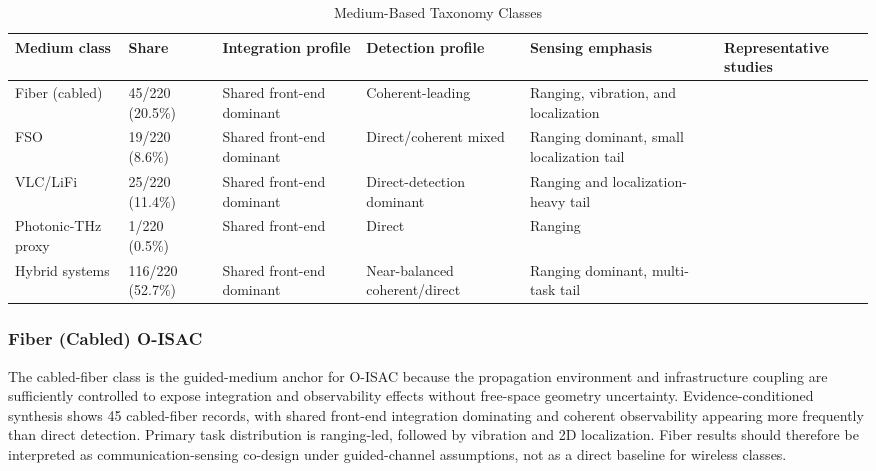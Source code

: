 \begin{table}[!t]
\caption{Medium-Based Taxonomy Classes}
\label{tab:medium-classes}
\centering
\footnotesize
\setlength{\tabcolsep}{4pt}
\begin{tabularx}{\textwidth}{p{}p{}p{}p{}p{}X}
\toprule
\textbf{Medium class} & \textbf{Share} & \textbf{Integration profile} & \textbf{Detection profile} & \textbf{Sensing emphasis} & \textbf{Representative studies} \\
\midrule
Fiber (cabled) & 45/220 (20.5\%) & Shared front-end dominant & Coherent-leading & Ranging, vibration, and localization & \cite{O_ISAC_006,O_ISAC_033,O_ISAC_046} \\
FSO & 19/220 (8.6\%) & Shared front-end dominant & Direct/coherent mixed & Ranging dominant, small localization tail & \cite{O_ISAC_021,O_ISAC_035,O_ISAC_199} \\
VLC/LiFi & 25/220 (11.4\%) & Shared front-end dominant & Direct-detection dominant & Ranging and localization-heavy tail & \cite{O_ISAC_068,O_ISAC_303,O_ISAC_039} \\
Photonic-THz proxy & 1/220 (0.5\%) & Shared front-end & Direct & Ranging & \cite{O_ISAC_016,O_ISAC_105,O_ISAC_070} \\
Hybrid systems & 116/220 (52.7\%) & Shared front-end dominant & Near-balanced coherent/direct & Ranging dominant, multi-task tail & \cite{O_ISAC_021,O_ISAC_077,O_ISAC_199} \\
\bottomrule
\end{tabularx}
\end{table}

\subsubsection{Fiber (Cabled) O-ISAC}
The cabled-fiber class is the guided-medium anchor for O-ISAC because the propagation environment and infrastructure coupling are sufficiently controlled to expose integration and observability effects without free-space geometry uncertainty. Evidence-conditioned synthesis shows 45 cabled-fiber records, with shared front-end integration dominating and coherent observability appearing more frequently than direct detection. Primary task distribution is ranging-led, followed by vibration and 2D localization. Fiber results should therefore be interpreted as communication-sensing co-design under guided-channel assumptions, not as a direct baseline for wireless classes.

